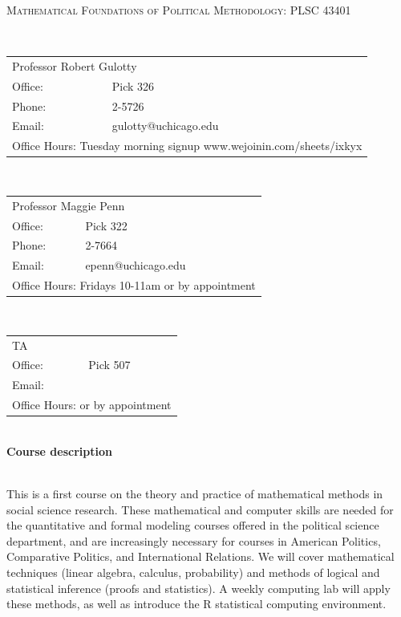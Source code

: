 \documentclass[11pt]{article}
\begin{document}
\begin{center}

\large
\textsc{Mathematical Foundations of Political Methodology: PLSC 43401}\\
\end{center}

\small

\ \\ \begin{tabular} {ll} \multicolumn{2}{l}{Professor Robert Gulotty}\\
Office: &Pick 326\\
Phone: &2-5726\\
Email: &gulotty@uchicago.edu\\
\multicolumn{2}{l}{Office Hours: Tuesday morning signup www.wejoinin.com/sheets/ixkyx}
\end{tabular}

\vspace{.15in}

\ \\ \begin{tabular} {ll} \multicolumn{2}{l}{Professor Maggie Penn}\\
Office: &Pick 322\\
Phone: &2-7664\\
Email: &epenn@uchicago.edu\\
\multicolumn{2}{l}{Office Hours: Fridays 10-11am or by appointment}
\end{tabular}

\vspace{.15in}

\ \\ \begin{tabular} {ll} \multicolumn{2}{l}{TA }\\
Office: & Pick 507\\
Email: &  \\
\multicolumn{2}{l}{Office Hours: or by appointment }
\end{tabular}

\vspace{.5in}

\ \\{\bf Course description}  

\ \\This is a first course on the theory and practice of mathematical methods in social science research.  These mathematical and computer skills are needed for the quantitative and formal modeling courses offered in the political science department, and are increasingly necessary for courses in American Politics, Comparative Politics, and International Relations.   We will cover mathematical techniques (linear algebra, calculus, probability) and methods of logical and statistical inference (proofs and statistics).  A weekly computing lab will apply these methods, as well as introduce the R statistical computing environment.
\end{document}
